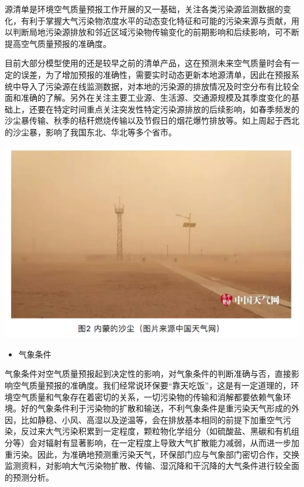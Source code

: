 \documentclass[]{book}
\providecommand{\tightlist}{%
  \setlength{\itemsep}{0pt}\setlength{\parskip}{0pt}}
\begin{document}
源清单是环境空气质量预报工作开展的又一基础，关注各类污染源监测数据的变化，有利于掌握大气污染物浓度水平的动态变化特征和可能的污染来源与贡献，用以判断局地污染源排放和邻近区域污染物传输变化的前期影响和后续影响，可不断提高空气质量预报的准确度。

目前大部分模型使用的还是较早之前的清单产品，这在预测未来空气质量时会有一定的误差，为了增加预报的准确性，需要实时动态更新本地源清单，因此在预报系统中导入了污染源在线监测数据，对本地的污染源的排放情况及时空分布有比较全面和准确的了解。另外在关注主要工业源、生活源、交通源规模及其季度变化的基础上，还要在特定时间重点关注突发性特定污染源排放的后续影响，如春季频发的沙尘暴传输、秋季的秸秆燃烧传输以及节假日的烟花爆竹排放等。如上周起于西北的沙尘暴，影响了我国东北、华北等多个省市。

\includegraphics[width=8.33in]{images/kqyb2}

\begin{itemize}
\tightlist
\item
  气象条件
\end{itemize}

气象条件对空气质量预报起到决定性的影响，对气象条件的判断准确与否，直接影响空气质量预报的准确度。我们经常说环保要``靠天吃饭''，这是有一定道理的，环境空气质量和气象存在着密切的关系，一切污染物的传输和消解都要依赖气象环境。好的气象条件利于污染物的扩散和输送，不利气象条件是重污染天气形成的外因，比如静稳、小风、高湿以及逆温等，会在排放基本相同的前提下加重空气污染，反过来大气污染积累到一定程度，颗粒物化学组分（如硫酸盐、黑碳和有机组分等）会对辐射有显著影响，在一定程度上导致大气扩散能力减弱，从而进一步加重污染。因此，为准确地预测重污染天气，环保部门应与气象部门密切合作，交换监测资料，对影响大气污染物扩散、传输、湿沉降和干沉降的大气条件进行较全面的预测分析。
\end{document}
